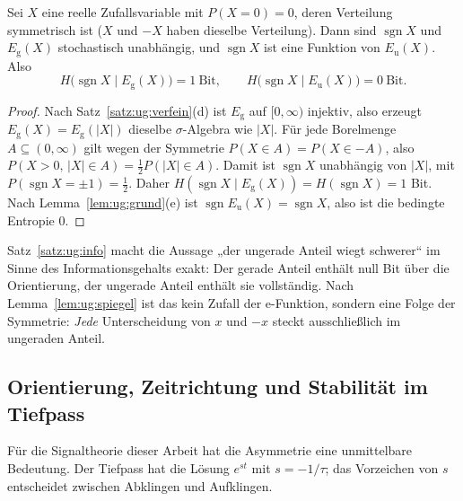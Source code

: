 \begin{satz}\label{satz:ug:info}
Sei $X$ eine reelle Zufallsvariable mit $P(X=0)=0$, deren Verteilung symmetrisch ist ($X$ und $-X$ haben dieselbe Verteilung). Dann sind $\operatorname{sgn}X$ und $E_{\mathrm g}(X)$ stochastisch unabhängig, und $\operatorname{sgn}X$ ist eine Funktion von $E_{\mathrm u}(X)$. Also
\[
H\big(\operatorname{sgn}X\mid E_{\mathrm g}(X)\big)=1\ \text{Bit},\qquad H\big(\operatorname{sgn}X\mid E_{\mathrm u}(X)\big)=0\ \text{Bit}.
\]
\end{satz}

\begin{proof}
Nach Satz~\ref{satz:ug:verfein}(d) ist $E_{\mathrm g}$ auf $[0,\infty)$ injektiv, also erzeugt $E_{\mathrm g}(X)=E_{\mathrm g}(|X|)$ dieselbe $\sigma$-Algebra wie $|X|$. Für jede Borelmenge $A\subseteq(0,\infty)$ gilt wegen der Symmetrie $P(X\in A)=P(X\in-A)$, also $P(X>0,\,|X|\in A)=\tfrac12P(|X|\in A)$. Damit ist $\operatorname{sgn}X$ unabhängig von $|X|$, mit $P(\operatorname{sgn}X=\pm1)=\tfrac12$. Daher $H(\operatorname{sgn}X\mid E_{\mathrm g}(X))=H(\operatorname{sgn}X)=1$ Bit. Nach Lemma~\ref{lem:ug:grund}(e) ist $\operatorname{sgn}E_{\mathrm u}(X)=\operatorname{sgn}X$, also ist die bedingte Entropie $0$.
\end{proof}

\begin{bemerkung}
Satz~\ref{satz:ug:info} macht die Aussage „der ungerade Anteil wiegt schwerer“ im Sinne des Informationsgehalts exakt: Der gerade Anteil enthält null Bit über die Orientierung, der ungerade Anteil enthält sie vollständig. Nach Lemma~\ref{lem:ug:spiegel} ist das kein Zufall der e-Funktion, sondern eine Folge der Symmetrie: \emph{Jede} Unterscheidung von $x$ und $-x$ steckt ausschließlich im ungeraden Anteil.
\end{bemerkung}

\subsection{Orientierung, Zeitrichtung und Stabilität im Tiefpass}
\label{sec:ug:zeit}

Für die Signaltheorie dieser Arbeit hat die Asymmetrie eine unmittelbare Bedeutung. Der Tiefpass hat die Lösung $e^{st}$ mit $s=-1/\tau$; das Vorzeichen von $s$ entscheidet zwischen Abklingen und Aufklingen.

